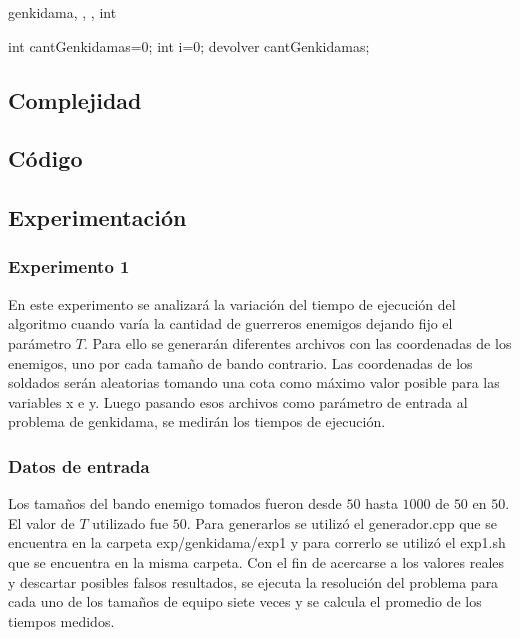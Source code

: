 	\begin{algoritmo}{genkidama}{, , , }{int}

		int cantGenkidamas=0;
  		int i=0;
  		devolver cantGenkidamas; \;
	\end{algoritmo} \;
	



    \subsection{Complejidad}


    \subsection{Código}


    \subsection{Experimentación}


    	\subsubsection*{Experimento 1}\;
			En este experimento se analizará la variación del tiempo de ejecución del algoritmo cuando varía la cantidad de guerreros enemigos dejando fijo el parámetro $T$. Para ello se generarán diferentes archivos con las coordenadas de los enemigos, uno por cada tamaño de bando contrario. Las coordenadas de los soldados serán aleatorias tomando una cota como máximo valor posible para las variables x e y. Luego pasando esos archivos como parámetro de entrada al problema de genkidama, se medirán los tiempos de ejecución. \;

		\subsubsection*{Datos de entrada}\;
			Los tamaños del bando enemigo tomados fueron  desde $50$ hasta $1000$ de $50$ en $50$. \;
			El valor de $T$ utilizado fue $50$.\;
			Para generarlos se utilizó el generador.cpp que se encuentra en la carpeta exp/genkidama/exp1 y para correrlo se utilizó el exp1.sh que se encuentra en la misma carpeta. \;
			Con el fin de acercarse a los valores reales y descartar posibles falsos resultados, se ejecuta la resolución del problema para cada uno de los tamaños de equipo siete veces y se calcula el promedio de los tiempos medidos.\;

